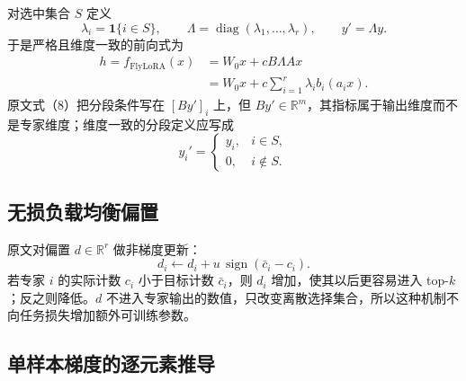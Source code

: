 \documentclass[11pt]{article}
\numberwithin{equation}{section}
\newcommand{\R}{\mathbb{R}}
\newcommand{\1}{\mathbf{1}}
\newcommand{\diag}{\operatorname{diag}}
\newcommand{\sgn}{\operatorname{sign}}
\begin{document}
对选中集合 $S$ 定义
\begin{equation}
  \lambda_i=\1\{i\in S\},
  \qquad
  \Lambda=\diag(\lambda_1,\ldots,\lambda_r),
  \qquad
  y'=\Lambda y.
\end{equation}
于是严格且维度一致的前向式为
\begin{align}
  h=f_{\mathrm{FlyLoRA}}(x)
  &=W_0x+cB\Lambda Ax \\
  &=W_0x+c\sum_{i=1}^{r}\lambda_i b_i(a_i x).
  \label{eq:fly-forward}
\end{align}
原文式（8）把分段条件写在 $[By']_i$ 上，但 $By'\in\R^m$，其指标属于输出维度而不是专家维度；维度一致的分段定义应写成
\begin{equation}
  y_i'=\begin{cases}
    y_i,&i\in S,\\
    0,&i\notin S.
  \end{cases}
\end{equation}

\subsection{无损负载均衡偏置}

原文对偏置 $d\in\R^r$ 做非梯度更新：
\begin{equation}
  d_i\leftarrow d_i+u\,\sgn(\bar c_i-c_i).
  \label{eq:bias-update}
\end{equation}
若专家 $i$ 的实际计数 $c_i$ 小于目标计数 $\bar c_i$，则 $d_i$ 增加，使其以后更容易进入 top-$k$；反之则降低。$d$ 不进入专家输出的数值，只改变离散选择集合，所以这种机制不向任务损失增加额外可训练参数。

\subsection{单样本梯度的逐元素推导}
\end{document}
